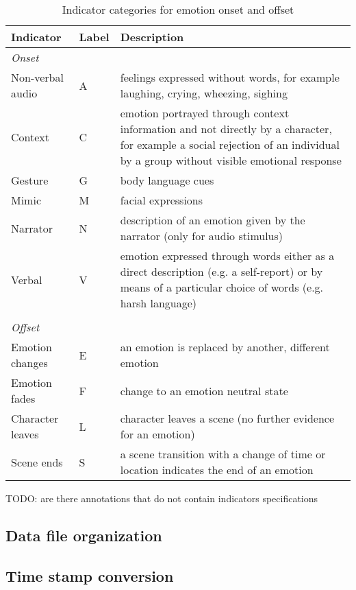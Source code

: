 \begin{table}
  \centering
  \begin{tabular}{llp{8cm}}
    Indicator & Label & Description \\
    \hline
    \textit{Onset}\\
    Non-verbal audio & A & feelings expressed without words, for example laughing, crying, wheezing, sighing\\
    Context & C & emotion portrayed through context information and not directly by a character, for example a social rejection of an individual by a group without visible emotional response\\
    Gesture & G & body language cues \\
    Mimic & M & facial expressions \\
    Narrator & N & description of an emotion given by the narrator (only for audio stimulus)\\
    Verbal & V & emotion expressed through words either as a direct description (e.g. a self-report) or by means of a particular choice of words (e.g. harsh language)\\
    \\
    \textit{Offset}\\
    Emotion changes & E & an emotion is replaced by another, different emotion \\
    Emotion fades & F & change to an emotion neutral state \\
    Character leaves & L & character leaves a scene (no further evidence for an emotion)\\
    Scene ends & S & a scene transition with a change of time or location indicates the end of an emotion\\

  \end{tabular}
  \caption{Indicator categories for emotion onset and offset}
  \label{tab:onoffset_indicators}
\end{table}

TODO: are there annotations that do not contain indicators specifications

\subsection*{Data file organization}

\subsection*{Time stamp conversion}

